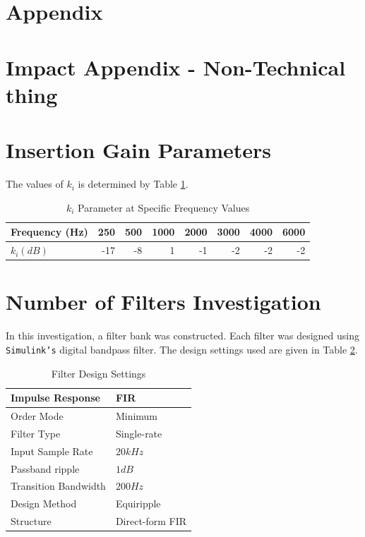 \documentclass[11pt,onecolumn]{witseiepaper}
\begin{document}
\section*{Appendix}
\begin{appendices}

\section{Impact Appendix - Non-Technical thing}


\section{Insertion Gain Parameters}
\label{app:insertGainParam}

\noindent The values of $k_i$ is determined by Table \ref{tab:kiVal}.

\begin{table}[htbp]
  \centering
  \caption{$k_i$ Parameter at Specific Frequency Values}
    \begin{tabular}{|l|r|r|r|r|r|r|r|}
    \hline
    \textbf{Frequency (Hz)} & 250   & 500   & 1000  & 2000  & 3000  & 4000  & 6000 \\
    \hline
    \textbf{$k_i (dB)$} & -17   & -8    & 1     & -1    & -2    & -2    & -2 \\
    \hline
    \end{tabular}%
  \label{tab:kiVal}%
\end{table}%


\section{Number of Filters Investigation}
\label{app:numFilt}

\noindent In this investigation, a filter bank was constructed. Each filter was designed using \texttt{Simulink's} digital bandpass filter. The design settings used are given in Table \ref{tab:numFilt_FiltSpec}.

\begin{table}[htbp]
  \centering
  \caption{Filter Design Settings}
  
    \begin{tabular}{|l|l|}
    \hline
    Impulse Response  & FIR  \\
    \hline
    Order Mode & Minimum \\
    \hline
    Filter Type & Single-rate \\
    \hline
    Input Sample Rate & $20kHz$ \\
    \hline
    Passband ripple & $1dB$ \\
    \hline
    Transition Bandwidth & $200Hz$ \\
    \hline
    Design Method & Equiripple \\
    \hline
    Structure  & Direct-form FIR \\
    \hline
    \end{tabular}%
  \label{tab:numFilt_FiltSpec}%
\end{table}%


\end{appendices}
\end{document}
